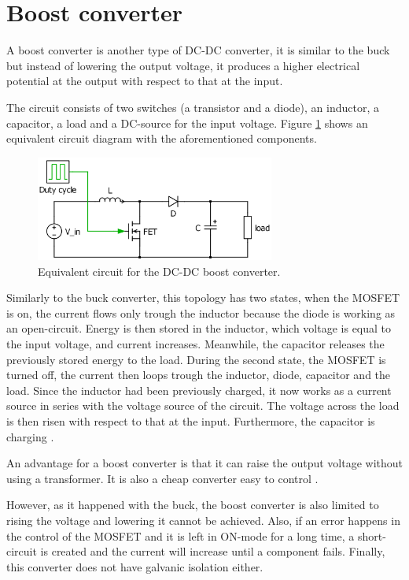 \section{Boost converter\label{Boost-C}}

A boost converter is another type of DC-DC converter, it is similar to the buck but instead of lowering the output voltage, it produces a higher electrical potential at the output with respect to that at the input.

The circuit consists of two switches (a transistor and a diode), an inductor, a capacitor, a load and a DC-source for the input voltage. Figure \ref{Boost-converter} shows an equivalent circuit diagram with the aforementioned components. %

\begin{figure}[htbp]
	\begin{center}
		\includegraphics[width=0.7\textwidth]{../Pictures/Boost-converter}
		\caption{Equivalent circuit for the DC-DC boost converter.}
		\label{Boost-converter}
	\end{center}	
\end{figure}

Similarly to the buck converter, this topology has two states, when the MOSFET is on, the current flows only trough the inductor because the diode  is working as an open-circuit. Energy is then stored in the inductor, which voltage is equal to the input voltage, and current increases. Meanwhile, the capacitor releases the previously stored energy to the load.
During the second state, the MOSFET is turned off, the current then loops trough the inductor, diode, capacitor and the load. Since the inductor had been previously charged, it now works as a current source in series with the voltage source of the circuit. The voltage across the load is then risen with respect to that at the input. Furthermore, the capacitor is charging \cite{schematicbuckandboost}.

An advantage for a boost converter is that it can raise the output voltage without using a transformer. It is also a cheap converter easy to control \cite{advantageboost}. 

However, as it happened with the buck, the boost converter is also limited to rising the voltage and lowering it cannot be achieved. Also, if an error happens in the control of the MOSFET and it is left in ON-mode for a long time, a short-circuit is created and the current will increase until a component fails. Finally, this converter does not have galvanic isolation either. 
 
